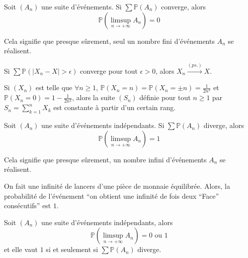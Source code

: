
  \begin{theorem}
    Soit $(A_n)$ une suite d'événements. Si $\sum \mathbb{P}(A_n)$ converge, alors
    \[ \mathbb{P} \left( \limsup_{n \rightarrow +\infty} A_n \right) = 0 \]
  \end{theorem}

  \begin{remark}
    Cela signifie que presque sûrement, seul un nombre fini d'événements $A_n$ se réalisent.
  \end{remark}

  \begin{corollary}
    Si $\sum \mathbb{P}(\vert X_n - X \vert > \epsilon)$ converge pour tout $\epsilon > 0$, alors $X_n \overset{(ps.)}{\longrightarrow} X$.
  \end{corollary}


  \begin{example}
    Si $(X_n)$ est telle que $\forall n \geq 1$, $\mathbb{P}(X_n = n) = \mathbb{P}(X_n = \pm n) = \frac{1}{2n^2}$ et $\mathbb{P}(X_n = 0) = 1 - \frac{1}{2n^2}$, alors la suite $(S_n)$ définie pour tout $n \geq 1$ par $S_n = \sum_{k=1}^n X_k$ est constante à partir d'un certain rang.
  \end{example}


  \begin{theorem}
    Soit $(A_n)$ une suite d'événements indépendants. Si $\sum \mathbb{P}(A_n)$ diverge, alors
    \[ \mathbb{P} \left( \limsup_{n \rightarrow +\infty} A_n \right) = 1 \]
  \end{theorem}

  \begin{remark}
    Cela signifie que presque sûrement, un nombre infini d'événements $A_n$ se réalisent.
  \end{remark}


  \begin{example}
    On fait une infinité de lancers d'une pièce de monnaie équilibrée. Alors, la probabilité de l'événement ``on obtient une infinité de fois deux ``Face'' consécutifs'' est $1$.
  \end{example}

  \begin{corollary}
    Soit $(A_n)$ une suite d'événements indépendants, alors
    \[ \mathbb{P} \left( \limsup_{n \rightarrow +\infty} A_n \right) = 0 \text{ ou } 1 \]
    et elle vaut $1$ si et seulement si $\sum \mathbb{P}(A_n)$ diverge.
  \end{corollary}

